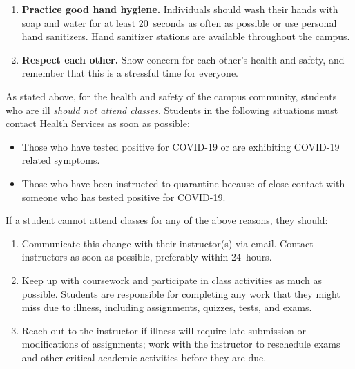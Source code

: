 \documentclass[11pt,letterpaper]{article}
\begin{document}
\begin{enumerate}[1.]
	\item {\bfseries Practice good hand hygiene.} Individuals should wash their hands with soap and water for at least 20~seconds as often as possible or use personal hand sanitizers. Hand sanitizer stations are available throughout the campus.

	\item {\bfseries Respect each other.} Show concern for each other's health and safety, and remember that this is a stressful time for everyone.
	\end{enumerate} \pspace


 \par

As stated above, for the health and safety of the campus community, students who are ill {\itshape should not attend classes}. Students in the following situations must contact Health Services as soon as possible: 

	\begin{itemize}
	\item Those who have tested positive for COVID-19 or are exhibiting COVID-19 related symptoms. 
	\item Those who have been instructed to quarantine because of close contact with someone who has tested positive for COVID-19.
	\end{itemize}

If a student cannot attend classes for any of the above reasons, they should:

	\begin{enumerate}[1.]
	\item Communicate this change with their instructor(s) via email. Contact instructors as soon as possible, preferably within 24~hours.
	\item Keep up with coursework and participate in class activities as much as possible. Students are responsible for completing any work that they might miss due to illness, including assignments, quizzes, tests, and exams.
	\item Reach out to the instructor if illness will require late submission or modifications of assignments; work with the instructor to reschedule exams and other critical academic activities before they are due.
	\end{enumerate}
\sectionbreak



\end{document}

